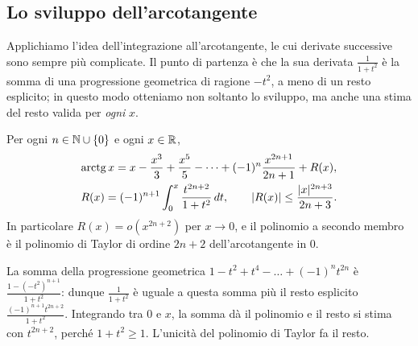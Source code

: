 \subsection{Lo sviluppo dell'arcotangente}

Applichiamo l'idea dell'integrazione all'arcotangente, le cui derivate successive sono
sempre più complicate. Il punto di partenza è che la sua derivata $\frac1{1+t^{2}}$ è la somma
di una progressione geometrica di ragione $-t^{2}$, a meno di un resto esplicito; in questo
modo otteniamo non soltanto lo sviluppo, ma anche una stima del resto valida per
\emph{ogni} $x$.

\begin{proposizione}\label{prop:sviluppo-arctg}
Per ogni $n\in\mathbb{N}\cup\left\{ 0 \right\}$ e ogni $x\in\mathbb{R}$,
\begin{equation}\label{eq:sviluppo-arctg}
\begin{gathered}
  \operatorname{arctg}x=x-\frac{x^{3}}3+\frac{x^{5}}5-\dots+(-1)^{n}\frac{x^{2n+1}}{2n+1}+R(x),\\
  R(x)=(-1)^{n+1}\int_{0}^{x}\frac{t^{2n+2}}{1+t^{2}}\,dt, \qquad
  \lvert R(x)\rvert\le\frac{\lvert x\rvert^{2n+3}}{2n+3} .
\end{gathered}
\end{equation}
In particolare $R(x)=o(x^{2n+2})$ per $x\to0$, e il polinomio a secondo membro è il polinomio
di Taylor di ordine $2n+2$ dell'arcotangente in $0$.
\end{proposizione}

\begin{schema}
\end{schema}

\begin{strategia}
La somma della progressione geometrica $1-t^{2}+t^{4}-\dots+(-1)^{n}t^{2n}$ è
$\frac{1-(-t^{2})^{n+1}}{1+t^{2}}$: dunque $\frac1{1+t^{2}}$ è uguale a questa somma più il resto esplicito
$\frac{(-1)^{n+1}t^{2n+2}}{1+t^{2}}$. Integrando tra $0$ e $x$, la somma dà il polinomio e il resto si
stima con $t^{2n+2}$, perché $1+t^{2}\ge1$. L'unicità del polinomio di Taylor fa il resto.
\end{strategia}

